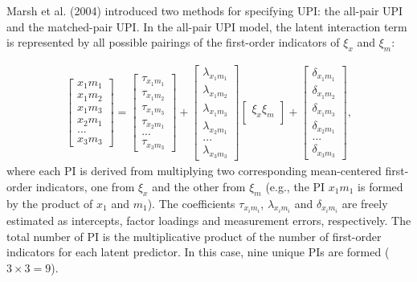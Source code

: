 \documentclass[
  man]{apa6}
\begin{document}
Marsh et al. (2004) introduced two methods for specifying UPI: the all-pair UPI and the matched-pair UPI. In the all-pair UPI model, the latent interaction term is represented by all possible pairings of the first-order indicators of \(\xi_{x}\) and \(\xi_{m}\):

\begin{align}
    \begin{bmatrix}
        x_{1}m_{1} \\
        x_{1}m_{2} \\
        x_{1}m_{3} \\ 
        x_{2}m_{1} \\
        ... \\
        x_{3}m_{3}
    \end{bmatrix} = 
    \begin{bmatrix}
        \tau_{x_{1}m_{1}} \\
        \tau_{x_{1}m_{2}} \\ 
        \tau_{x_{1}m_{3}} \\ 
        \tau_{x_{2}m_{1}} \\ 
        ...\\
        \tau_{x_{3}m_{3}} 
    \end{bmatrix} +
    \begin{bmatrix}
        \lambda_{x_{1}m_{1}} \\
        \lambda_{x_{1}m_{2}} \\ 
        \lambda_{x_{1}m_{3}} \\ 
        \lambda_{x_{2}m_{1}} \\ 
        ...\\
        \lambda_{x_{3}m_{3}}
    \end{bmatrix}
    \begin{bmatrix}
        \xi_{x}\xi_{m} \\
    \end{bmatrix} +
    \begin{bmatrix}
        \delta_{x_{1}m_{1}} \\
        \delta_{x_{1}m_{2}} \\ 
        \delta_{x_{1}m_{3}} \\
        \delta_{x_{2}m_{1}} \\
        ... \\
        \delta_{x_{3}m_{3}}
    \end{bmatrix},
\end{align}
where each PI is derived from multiplying two corresponding mean-centered first-order indicators, one from \(\xi_{x}\) and the other from \(\xi_{m}\) (e.g., the PI \(x_{1}m_{1}\) is formed by the product of \(x_{1}\) and \(m_{1}\)). The coefficients \({\tau_{x_{i}m_{i}}}\), \({\lambda_{x_{i}m_{i}}}\) and \({\delta_{x_{i}m_{i}}}\) are freely estimated as intercepts, factor loadings and measurement errors, respectively. The total number of PI is the multiplicative product of the number of first-order indicators for each latent predictor. In this case, nine unique PIs are formed (\(3 \times 3 = 9\)).
\end{document}
